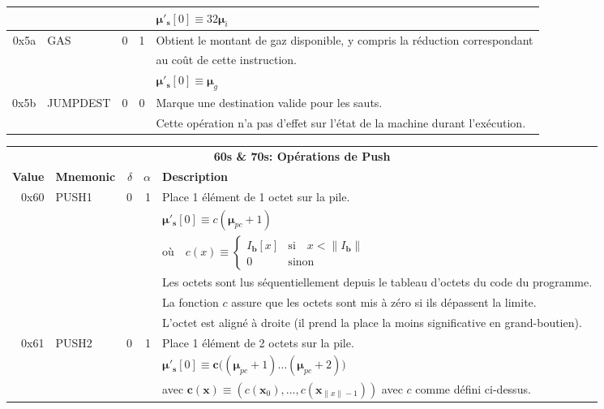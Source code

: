 \documentclass[9pt,oneside]{amsart}
\begin{document}
\begin{tabular*}{\columnwidth}[h]{rlrrl}
&&&& $\boldsymbol{\mu}'_\mathbf{s}[0] \equiv 32\boldsymbol{\mu}_{i}$ \\
\midrule
0x5a & {\small GAS} & 0 & 1 & Obtient le montant de gaz disponible,  y compris la réduction correspondant \\
&&&& au coût de cette instruction. \\
&&&& $\boldsymbol{\mu}'_\mathbf{s}[0] \equiv \boldsymbol{\mu}_{g}$ \\
\midrule
0x5b & {\small JUMPDEST} & 0 & 0 & Marque une destination valide pour les sauts. \\
&&&& Cette opération n'a pas d'effet sur l'état de la machine durant l'exécution. \\
\bottomrule
\end{tabular*}

\begin{tabular*}{\columnwidth}[h]{rlrrl}
\toprule
\multicolumn{5}{c}{\textbf{60s \& 70s: Opérations de Push}} \vspace{5pt} \\
\textbf{Value} & \textbf{Mnemonic} & $\delta$ & $\alpha$ & \textbf{Description} \vspace{5pt} \\
0x60 & {\small PUSH1} & 0 & 1 & Place 1 élément de 1 octet sur la pile. \\
&&&& $\boldsymbol{\mu}'_\mathbf{s}[0] \equiv c(\boldsymbol{\mu}_{pc} + 1)$ \\
&&&& $\text{où} \quad c(x) \equiv \begin{cases} I_\mathbf{b}[x] & \text{si} \quad x < \lVert I_\mathbf{b} \rVert \\ 0 & \text{sinon} \end{cases}$ \\
&&&& Les octets sont lus séquentiellement depuis le tableau d'octets du code du programme. \\
&&&& La fonction $c$ assure que les octets sont mis à zéro si ils dépassent la limite.\\
&&&& L'octet est aligné à droite (il prend la place la moins significative en grand-boutien). \\
\midrule
0x61 & {\small PUSH2} & 0 & 1 & Place 1 élément de 2 octets sur la pile. \\
&&&& $\boldsymbol{\mu}'_\mathbf{s}[0] \equiv \boldsymbol{c}\big( (\boldsymbol{\mu}_{pc} + 1) \dots (\boldsymbol{\mu}_{pc} + 2) \big)$ \\
&&&& avec $\boldsymbol{c}(\boldsymbol{x}) \equiv (c(\boldsymbol{x}_0), ..., c(\boldsymbol{x}_{\lVert x \rVert -1})) $ avec $c$ comme défini ci-dessus. \\

\end{tabular*}
\end{document}
